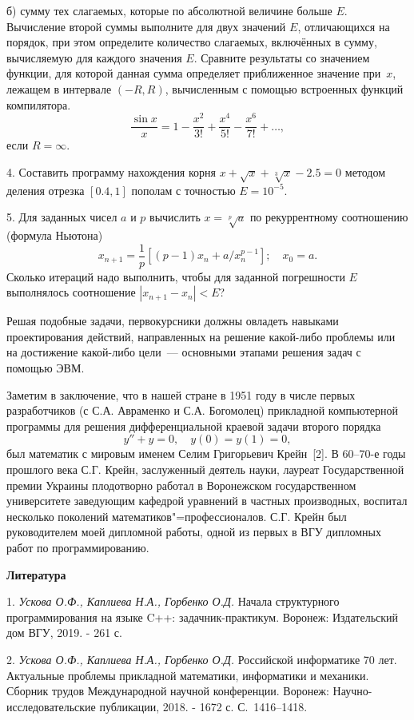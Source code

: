б) сумму тех слагаемых, которые по абсолютной величине больше $E$. Вычисление второй суммы выполните для двух значений $E$,
отличающихся на порядок, при этом определите количество слагаемых, включённых в сумму, вычисляемую для каждого значения
$E$.
Сравните результаты со значением функции, для которой данная сумма определяет приближенное значение при \,$x$, лежащем в интервале
\linebreak
$(-R, R)$, вычисленным с помощью встроенных функций
ко\-мпилятора.
$$
\frac{\sin x}{x}=1-\frac{x^2}{3!}+\frac{x^4}{5!}-\frac{x^6}{7!}+\dots,
$$
если $R=\infty$.

4. Составить программу нахождения корня $x+\sqrt{x}+\sqrt[3]{x}-2.5=0$ методом деления отрезка $[0.4, 1]$ пополам с точностью
$E=10^{-5}$.

5. Для заданных чисел $a$ и $p$ вычислить $x=\sqrt[p]{a}$ по рекуррентному соотношению (формула Ньютона)
$$
x_{n+1}=\frac{1}{p}[(p-1)x_n+a/x_n^{p-1}]; \quad x_0=a.
$$
Сколько итераций надо выполнить, чтобы для заданной погрешности $E$ выполнялось соотношение $|x_{n+1}-x_n|<E$?

Решая подобные задачи, первокурсники должны овладеть навыками проектирования действий, направленных на решение какой-либо
проблемы или на достижение какой-либо цели~--- основными этапами решения задач с помощью ЭВМ.

Заметим в заключение, что в нашей стране в 1951 году в числе первых разработчиков (с С.А. Авраменко и С.А. Богомолец)
прикладной компьютерной программы для решения дифференциальной краевой задачи второго порядка
$$
y''+y=0, \quad y(0)=y(1)=0,
$$
был математик с мировым именем Селим Григорьевич \linebreak Крейн~[2].
В 60--70-е годы прошлого века С.Г. Крейн, заслуженный деятель
науки, лауреат Государственной премии Украины плодотворно работал в Воронежском государственном университете заведующим кафедрой
уравнений в частных производных, воспитал несколько поколений математиков"=профессионалов. С.Г. Крейн был руководителем
моей дипломной работы, одной из первых в ВГУ дипломных работ по программированию.

\smallskip \centerline {\bf Литература} \nopagebreak

1. {\it Ускова О.Ф., Каплиева Н.А., Горбенко О.Д.} Начала структурного программирования на языке C++: задачник-практикум.
Воронеж: Издательский дом ВГУ, 2019. - 261 с.

2. {\it Ускова О.Ф., Каплиева Н.А., Горбенко О.Д.} Российской информатике 70 лет. Актуальные проблемы прикладной математики,
информатики и механики. Сборник трудов Международной научной конференции.
Воронеж: Научно-исследовательские публикации, 2018. - 1672 с. С.~1416--1418.
